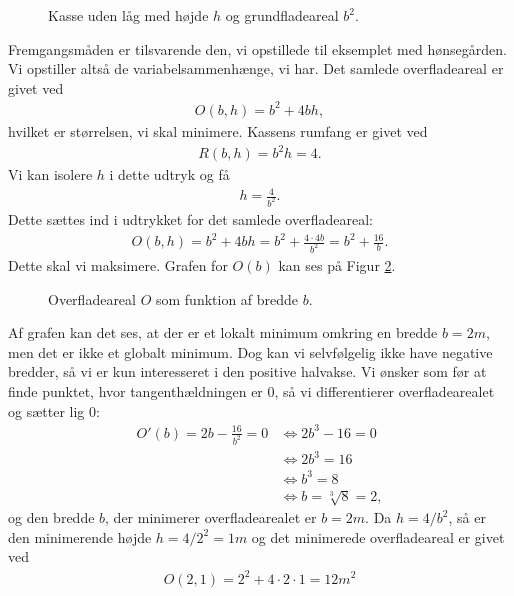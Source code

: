 \begin{exa}
\begin{figure}[H]
\caption{Kasse uden låg med højde $h$ og grundfladeareal $b^2$.}
\label{fig:kasse}
\end{figure}
Fremgangsmåden er tilsvarende den, vi opstillede til eksemplet med hønsegården. Vi opstiller altså de variabelsammenhænge, vi har. Det samlede overfladeareal er givet ved
\begin{align*}
O(b,h) = b^2+4bh,
\end{align*}
hvilket er størrelsen, vi skal minimere. Kassens rumfang er givet ved
\begin{align*}
R(b,h) = b^2h = 4.
\end{align*}
Vi kan isolere $h$ i dette udtryk og få
\begin{align*}
h = \frac{4}{b^2}.
\end{align*}
Dette sættes ind i udtrykket for det samlede overfladeareal:
\begin{align*}
O(b,h) = b^2+ 4bh = b^2 + \frac{4\cdot4b}{b^2} = b^2+\frac{16}{b}.
\end{align*}
Dette skal vi maksimere. Grafen for $O(b)$ kan ses på Figur \ref{fig:kassegraf}.
\begin{figure}[H]
	\centering
	\caption{Overfladeareal $O$ som funktion af bredde $b$.}
	\label{fig:kassegraf}
\end{figure}

Af grafen kan det ses, at der er et lokalt minimum omkring en bredde $b=2m$, men det er ikke et globalt minimum. Dog kan vi selvfølgelig ikke have negative bredder, så vi er kun interesseret i den positive halvakse. Vi ønsker som før at finde punktet, hvor tangenthældningen er $0$, så vi differentierer overfladearealet og sætter lig $0$:
\begin{align*}
O'(b) = 2b-\frac{16}{b^2}=0&\Leftrightarrow 2b^3-16=0\\
						&\Leftrightarrow 2b^3 = 16\\
						&\Leftrightarrow b^3 = 8\\
						&\Leftrightarrow b = \sqrt[3]{8} = 2,
\end{align*}
og den bredde $b$, der minimerer overfladearealet er $b=2m$. Da $h=4/b^2$, så er den minimerende højde $h=4/2^2=1m$ og det minimerede overfladeareal er givet ved
\begin{align*}
O(2,1) = 2^2+4\cdot 2\cdot 1 = 12m^2
\end{align*}
\end{exa}

